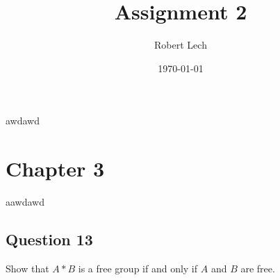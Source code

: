 %
\titleformat{\section}[block]{\Large\bfseries\filcenter}{}{1em}{}

\usepackage{amsfonts}
\usepackage{fancyhdr}
\usepackage{comment}
\usepackage[a4paper, top=2.5cm, bottom=2.5cm, left=2.2cm, right=2.2cm]%
{geometry}
\usepackage{times}
\usepackage{amsmath}
\usepackage{changepage}
\usepackage{amssymb}
\usepackage{graphicx}%
\usepackage{xcolor}
\usepackage{breqn}

\setcounter{MaxMatrixCols}{30}
\newtheorem{theorem}{Theorem}
\newtheorem{acknowledgement}[theorem]{Acknowledgement}
\newtheorem{algorithm}[theorem]{Algorithm}
\newtheorem{axiom}{Axiom}
\newtheorem{case}[theorem]{Case}
\newtheorem{claim}[theorem]{Claim}
\newtheorem{conclusion}[theorem]{Conclusion}
\newtheorem{conjecture}[theorem]{Conjecture}
\newtheorem{corollary}[theorem]{Corollary}
\newtheorem{criterion}[theorem]{Criterion}
\newtheorem{definition}[theorem]{Definition}
\newtheorem{example}[theorem]{Example}
\newtheorem{exercise}[theorem]{Exercise}
\newtheorem{lemma}[theorem]{Lemma}
\newtheorem{notation}[theorem]{Notation}
\newtheorem{problem}[theorem]{Problem}
\newtheorem{proposition}[theorem]{Proposition}
\newtheorem{remark}[theorem]{Remark}
\newtheorem{solution}[theorem]{Solution}
\newtheorem{summary}[theorem]{Summary}
\newenvironment{proof}[1][Proof]{\textbf{#1.} }{\ \rule{0.5em}{0.5em}}

\newcommand{\C}{\mathbb{C}}
\newcommand{\F}{\mathbb{F}}
\newcommand{\N}{\mathbb{N}}
\newcommand{\Q}{\mathbb{Q}}
\newcommand{\R}{\mathbb{R}}
\newcommand{\Z}{\mathbb{Z}}
\newcommand{\Mod}[1]{\ (\mathrm{mod}\ #1)}
\newcommand{\rpm}{\raisebox{.2ex}{$\scriptstyle\pm$}}
awdawd


\title{Assignment 2}
\author{Robert Lech}
\date{\today}
\maketitleawdaw
\section*{Chapter 3}aawdawd

\subsection*{Question 13}

Show that $A*B$ is a free group if and only if $A$ and $B$ are free.\\

